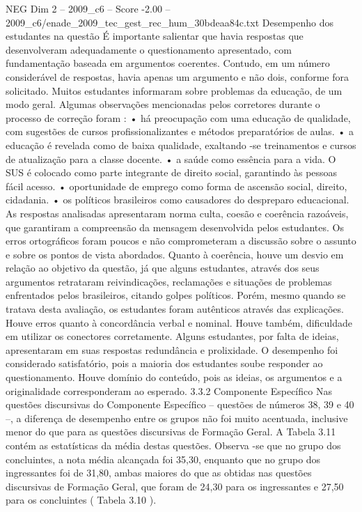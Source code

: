 \begin{textsample}{NEG Dim 2 – 2009\_c6 – Score -2.00 – 2009\_c6/enade\_2009\_tec\_gest\_rec\_hum\_30bdeaa84c.txt}
Desempenho dos estudantes na questão É importante salientar que havia respostas que desenvolveram adequadamente o questionamento apresentado, com fundamentação baseada em argumentos coerentes.
Contudo, em um número considerável de respostas, havia apenas um argumento e não dois, conforme fora solicitado.
Muitos estudantes informaram sobre problemas da educação, de um modo geral.
Algumas observações mencionadas pelos corretores durante o processo de correção foram : • há preocupação com uma educação de qualidade, com sugestões de cursos profissionalizantes e métodos preparatórios de aulas. • a educação é revelada como de baixa qualidade, exaltando -se treinamentos e cursos de atualização para a classe docente. • a saúde como essência para a vida.
O SUS é colocado como parte integrante de direito social, garantindo às pessoas fácil acesso. • oportunidade de emprego como forma de ascensão social, direito, cidadania. • os políticos brasileiros como causadores do despreparo educacional.
As respostas analisadas apresentaram norma culta, coesão e coerência razoáveis, que garantiram a compreensão da mensagem desenvolvida pelos estudantes.
Os erros ortográficos foram poucos e não comprometeram a discussão sobre o assunto e sobre os pontos de vista abordados.
Quanto à coerência, houve um desvio em relação ao objetivo da questão, já que alguns estudantes, através dos seus argumentos retrataram reivindicações, reclamações e situações de problemas enfrentados pelos brasileiros, citando golpes políticos.
Porém, mesmo quando se tratava desta avaliação, os estudantes foram autênticos através das explicações.
Houve erros quanto à concordância verbal e nominal.
Houve também, dificuldade em utilizar os conectores corretamente.
Alguns estudantes, por falta de ideias, apresentaram em suas respostas redundância e prolixidade.
O desempenho foi considerado satisfatório, pois a maioria dos estudantes soube responder ao questionamento.
Houve domínio do conteúdo, pois as ideias, os argumentos e a originalidade corresponderam ao esperado. 3.3.2 Componente Específico Nas questões discursivas do Componente Específico – questões de números 38, 39 e 40 –, a diferença de desempenho entre os grupos não foi muito acentuada, inclusive menor do que para as questões discursivas de Formação Geral.
A Tabela 3.11 contém as estatísticas da média destas questões.
Observa -se que no grupo dos concluintes, a nota média alcançada foi 35,30, enquanto que no grupo dos ingressantes foi de 31,80, ambas maiores do que as obtidas nas questões discursivas de Formação Geral, que foram de 24,30 para os ingressantes e 27,50 para os concluintes ( Tabela 3.10 ).

\end{textsample}
